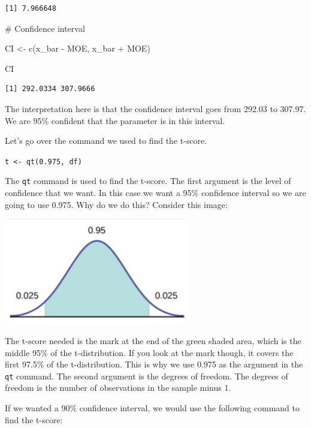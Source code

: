 \documentclass[
  letterpaper,
  DIV=11,
  numbers=noendperiod]{scrreprt}
\newenvironment{Shaded}{\begin{snugshade}}{\end{snugshade}}
\newcommand{\CommentTok}[1]{\textcolor[rgb]{0.37,0.37,0.37}{#1}}
\newcommand{\FunctionTok}[1]{\textcolor[rgb]{0.28,0.35,0.67}{#1}}
\newcommand{\NormalTok}[1]{\textcolor[rgb]{0.00,0.23,0.31}{#1}}
\newcommand{\OtherTok}[1]{\textcolor[rgb]{0.00,0.23,0.31}{#1}}
\newcommand{\SpecialCharTok}[1]{\textcolor[rgb]{0.37,0.37,0.37}{#1}}
\begin{document}
\begin{verbatim}
[1] 7.966648
\end{verbatim}

\begin{Shaded}
\begin{Highlighting}[]
\CommentTok{\# Confidence interval}

\NormalTok{CI }\OtherTok{\textless{}{-}} \FunctionTok{c}\NormalTok{(x\_bar }\SpecialCharTok{{-}}\NormalTok{ MOE, x\_bar }\SpecialCharTok{+}\NormalTok{ MOE)}

\NormalTok{CI}
\end{Highlighting}
\end{Shaded}

\begin{verbatim}
[1] 292.0334 307.9666
\end{verbatim}

The interpretation here is that the confidence interval goes from 292.03
to 307.97. We are 95\% confident that the parameter is in this interval.

Let's go over the command we used to find the t-score.

\texttt{t\ \textless{}-\ qt(0.975,\ df)}

The \texttt{qt} command is used to find the t-score. The first argument
is the level of confidence that we want. In this case we want a 95\%
confidence interval so we are going to use 0.975. Why do we do this?
Consider this image:

\includegraphics[width=0.6\textwidth,height=\textheight]{./images/EPCI_9.jpg}

The t-score needed is the mark at the end of the green shaded area,
which is the middle 95\% of the t-distribution. If you look at the mark
though, it covers the first 97.5\% of the t-distribution. This is why we
use 0.975 as the argument in the \texttt{qt} command. The second
argument is the degrees of freedom. The degrees of freedom is the number
of observations in the sample minus 1.

If we wanted a 90\% confidence interval, we would use the following
command to find the t-score:
\end{document}
